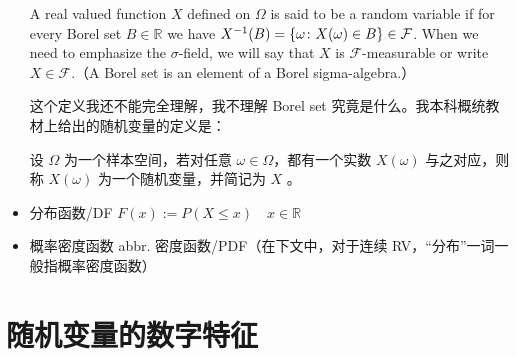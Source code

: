 \documentclass[12pt,uft8]{ctexrep}
\begin{document}
\begin{itemize}
A real valued function $X$ defined on $\Omega$ is said to be a random variable if for every Borel set $B\in\mathbb R$ we have $X^{-1}(B) = \qty{\omega\colon X(\omega)\in B}\in\mathcal{F}$. When we need to emphasize the $\sigma$-field, we will say that $X$ is $\mathcal{F}$-measurable or write $X\in\mathcal{F}$.（A Borel set is an element of a Borel sigma-algebra.）

这个定义我还不能完全理解，我不理解 Borel set 究竟是什么。我本科概统教材上给出的随机变量的定义是：

设 $\Omega$ 为一个样本空间，若对任意 $\omega\in\Omega$，都有一个实数 $X(\omega)$ 与之对应，则称 $X(\omega)$ 为一个随机变量，并简记为 $X$ 。

\item 分布函数/DF $F(x) := P(X\le x)\quad x\in\mathbb R$
\item 概率密度函数 abbr. 密度函数/PDF（在下文中，对于连续 RV，“分布”一词一般指概率密度函数）
\end{itemize}

\section{随机变量的数字特征}
\end{document}

